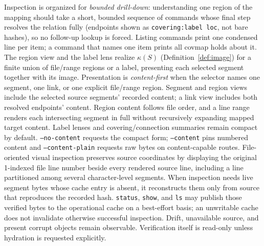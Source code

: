 \documentclass[11pt,a4paper]{article}
\begin{document}
Inspection is organized for \emph{bounded drill-down}: understanding one
region of the mapping should take a short, bounded sequence of commands
whose final step resolves the relation fully (endpoints shown as
\texttt{covering:label loc}, not bare hashes), so no follow-up lookup is
forced. Listing commands print one condensed line per item; a command that
names one item prints all covmap holds about it. The region view and the label
lens realize $\kappa(S)$ (Definition~\ref{def:image}) for a finite union of
file/range regions or a label, presenting each selected segment together with
its image.
Presentation is \emph{content-first} when the selector names one segment, one
link, or one explicit file/range region. Segment and region views include the
selected source segments' recorded content; a link view includes both resolved
endpoints' content. Region content follows file order, and a line range renders
each intersecting segment in full without recursively expanding mapped target
content. Label lenses and covering/connection summaries remain compact by
default. \texttt{--no-content} requests the compact form; \texttt{--content}
pins numbered content and \texttt{--content-plain} requests raw bytes on
content-capable routes.
File-oriented visual inspection preserves source coordinates by displaying
the original 1-indexed file line number beside every rendered source line,
including a line partitioned among several character-level segments.
When inspection needs live segment bytes whose cache entry is absent, it
reconstructs them only from source that reproduces the recorded hash.
\texttt{status}, \texttt{show}, and \texttt{ls} may publish those verified
bytes to the operational cache on a best-effort basis; an unwritable cache
does not invalidate otherwise successful inspection. Drift, unavailable
source, and present corrupt objects remain observable. Verification itself is
read-only unless hydration is requested explicitly.
\end{document}
